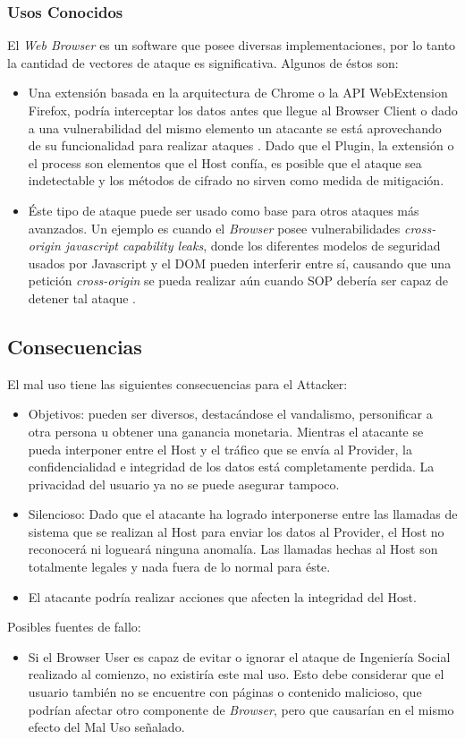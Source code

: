\documentclass{sig-alternate-05-2015}
\begin{document}
  \subsubsection{Usos Conocidos} El \textit{Web Browser} es un software que posee diversas implementaciones, por lo tanto la cantidad de vectores de ataque es significativa. Algunos de éstos son:
      \begin{itemize}
        \item  Una extensión basada en la arquitectura de Chrome o la API WebExtension Firefox, podría interceptar los datos antes que llegue al Browser Client \cite{Paola2006} o dado a una vulnerabilidad del mismo elemento un atacante se está aprovechando de su funcionalidad para realizar ataques \cite{Liu2012, Barth2010}. Dado que el Plugin, la extensión o el process son elementos que el Host confía, es posible que el ataque sea indetectable y los métodos de cifrado no sirven como medida de mitigación.
        \item Éste tipo de ataque puede ser usado como base para otros ataques más avanzados. Un ejemplo es cuando el \textit{Browser} posee vulnerabilidades \textit{cross-origin javascript capability leaks}, donde los diferentes modelos de seguridad usados por Javascript y el DOM pueden interferir entre sí, causando que una petición \textit{cross-origin} se pueda realizar aún cuando SOP debería ser capaz de detener tal ataque \cite{Barth2009}.
      \end{itemize}


\subsection{Consecuencias}
  El mal uso tiene las siguientes consecuencias para el Attacker:
  \begin{itemize}
    \item Objetivos: pueden ser diversos, destacándose el vandalismo, personificar a otra persona u obtener una ganancia monetaria. Mientras el atacante se pueda interponer entre el Host y el tráfico que se envía al Provider, la confidencialidad e integridad de los datos está completamente perdida. La privacidad del usuario ya no se puede asegurar tampoco.
    \item Silencioso: Dado que el atacante ha logrado interponerse entre las llamadas de sistema que se realizan al Host para enviar los datos al Provider, el Host no reconocerá ni logueará ninguna anomalía. Las llamadas hechas al Host son totalmente legales y nada fuera de lo normal para éste.
    \item El atacante podría realizar acciones que afecten la integridad del Host.
  \end{itemize}
  Posibles fuentes de fallo:
  \begin{itemize}
    \item Si el Browser User es capaz de evitar o ignorar el ataque de Ingeniería Social realizado al comienzo, no existiría este mal uso. Esto debe considerar que el usuario también no se encuentre con páginas o contenido malicioso, que podrían afectar otro componente de \textit{Browser}, pero que causarían en el mismo efecto del Mal Uso señalado.
  \end{itemize}
\end{document}
